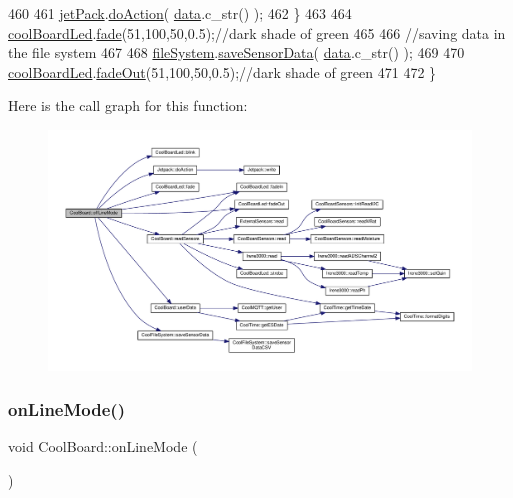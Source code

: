 \begin{DoxyCode}
460     
461         \hyperlink{classCoolBoard_a30b1357881b01ccbec676856a91e48e9}{jetPack}.\hyperlink{classJetpack_a9e703197093094b963f9ad57817495b8}{doAction}( \hyperlink{classCoolBoard_a427fb753dd8575bdf821c70a5c63d695}{data}.c\_str() );
462     \}
463     
464     \hyperlink{classCoolBoard_a1b1d3c684a5baa56b08486e192fd8e97}{coolBoardLed}.\hyperlink{classCoolBoardLed_af1cacbaa88db8bcf6042c1083ba41155}{fade}(51,100,50,0.5);\textcolor{comment}{//dark shade of green  }
465     
466     \textcolor{comment}{//saving data in the file system}
467     
468     \hyperlink{classCoolBoard_a42c2586fbb13ff7f06538e9284e8538d}{fileSystem}.\hyperlink{classCoolFileSystem_afa3a4feae94871d4d3b6bebb701c2e67}{saveSensorData}( \hyperlink{classCoolBoard_a427fb753dd8575bdf821c70a5c63d695}{data}.c\_str() );
469 
470     \hyperlink{classCoolBoard_a1b1d3c684a5baa56b08486e192fd8e97}{coolBoardLed}.\hyperlink{classCoolBoardLed_a93d545679237e8cc858324367149775c}{fadeOut}(51,100,50,0.5);\textcolor{comment}{//dark shade of green    }
471 
472 \}
\end{DoxyCode}
Here is the call graph for this function\+:\nopagebreak
\begin{figure}[H]
\begin{center}
\leavevmode
\includegraphics[width=350pt]{classCoolBoard_ae6b5e1274d760462290192acea4adca8_cgraph}
\end{center}
\end{figure}
\mbox{\label{classCoolBoard_aa0bbc4bc605e35618d18e68795c61363}} 
\subsubsection{\texorpdfstring{on\+Line\+Mode()}{onLineMode()}}
{\footnotesize\ttfamily void Cool\+Board\+::on\+Line\+Mode (\begin{DoxyParamCaption}{ }\end{DoxyParamCaption})}

